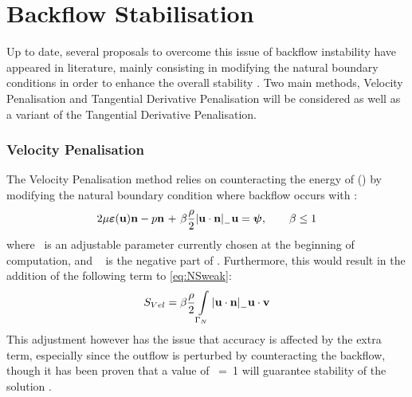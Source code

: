 \section{Backflow Stabilisation}
Up to date, several proposals to overcome this issue of backflow instability have appeared in literature, mainly consisting in modifying the natural boundary conditions in order to enhance the overall stability \cite{bertoglio2017}. Two main methods, Velocity Penalisation and Tangential Derivative Penalisation will be considered as well as a variant of the Tangential Derivative Penalisation. 
\subsubsection{Velocity Penalisation}
The Velocity Penalisation method relies on counteracting the energy of ({\large \textasteriskcentered}) by modifying the natural boundary condition where backflow occurs with \cite{Bruneau1994}:
\begin{align}\label{eq:VeloPenal}
    2\mu\bm{\varepsilon}({\textbf{u}}){\textbf{n}} - p{{\textbf{n}}} ~{ + ~\beta\frac{\rho}{2}\abs{{\textbf{u}}\cdot {\textbf{n}}}_{-}{\textbf{u}}} = \bm{\psi}, \qquad \beta \leq 1
\end{align}
where \mbeta~is an adjustable parameter currently chosen at the beginning of computation, and ~ is the negative part of \mathm{\bmu\cdot\bmn}. Furthermore, this would result in the addition of the following term to \autoref{eq:NSweak}:
\begin{equation}\label{eq:stabVeloPen}
    S_{Vel} = \beta\frac{\rho}{2}\int\limits_{\Gamma_{N}}\abs{{\textbf{u}}\cdot{\textbf{n}}}_{-}{\textbf{u}}\cdot{\textbf{v}}
\end{equation}
This adjustment however has the issue that accuracy is affected by the extra term, especially since the outflow is perturbed by counteracting the backflow, though it has been proven that a value of \mbeta~=~1 will guarantee stability of the solution \cite{Bruneau1996}.
